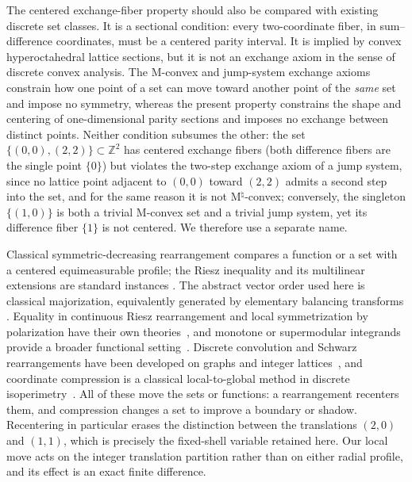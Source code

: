 \documentclass[pdflatex,sn-mathphys-num]{sn-jnl}
\theoremstyle{thmstyleone}
\theoremstyle{thmstylethree}
\theoremstyle{thmstyletwo}
\newcommand{\Z}{\mathbb Z}
\begin{document}
The centered exchange-fiber property should also be compared with existing
discrete set classes.  It is a sectional condition: every two-coordinate
fiber, in sum--difference coordinates, must be a centered parity interval.
It is implied by convex hyperoctahedral lattice sections, but it is not an
exchange axiom in the sense of discrete convex analysis.  The M-convex and
jump-system exchange axioms~\cite{Murota03,BouchetCunningham95} constrain
how one point of a set can move toward another point of the \emph{same} set
and impose no symmetry, whereas the present property constrains the shape
and centering of one-dimensional parity sections and imposes no exchange
between distinct points.  Neither condition subsumes the other: the set
$\{(0,0),(2,2)\}\subset\Z^2$ has centered exchange fibers (both difference
fibers are the single point $\{0\}$) but violates the two-step exchange
axiom of a jump system, since no lattice point adjacent to $(0,0)$ toward
$(2,2)$ admits a second step into the set, and for the same reason it is
not M$^\natural$-convex; conversely, the singleton $\{(1,0)\}$ is both a
trivial M-convex set and a trivial jump system, yet its difference fiber
$\{1\}$ is not centered.  We therefore use a separate name.

Classical symmetric-decreasing rearrangement compares a function or a set
with a centered equimeasurable profile; the Riesz inequality and its
multilinear extensions are standard instances
\cite{Riesz30,BrascampLiebLuttinger74,LiebLoss01}.  The abstract vector order
used here is classical majorization, equivalently generated by elementary
balancing transforms
\cite{HardyLittlewoodPolya52,MarshallOlkinArnold11}.  Equality in
continuous Riesz rearrangement and local symmetrization by polarization have
their own theories~\cite{Burchard96,BrockSolynin00}, and monotone or
supermodular integrands provide a broader functional
setting~\cite{BurchardHajaiej06}.  Discrete convolution and Schwarz
rearrangements have been developed on graphs and integer
lattices~\cite{Hajaiej10,GuptaSteinerberger24,HajaiejHanHua22}, and
coordinate compression is a classical local-to-global method in discrete
isoperimetry~\cite{BollobasLeaderCompression91,BarberErde18}.  All of these
move the sets or functions: a rearrangement recenters them, and compression
changes a set to improve a boundary or shadow.  Recentering in particular
erases the distinction between the translations $(2,0)$ and $(1,1)$, which
is precisely the fixed-shell variable retained here.  Our local move acts on
the integer translation partition rather than on either radial profile, and
its effect is an exact finite difference.
\end{document}
